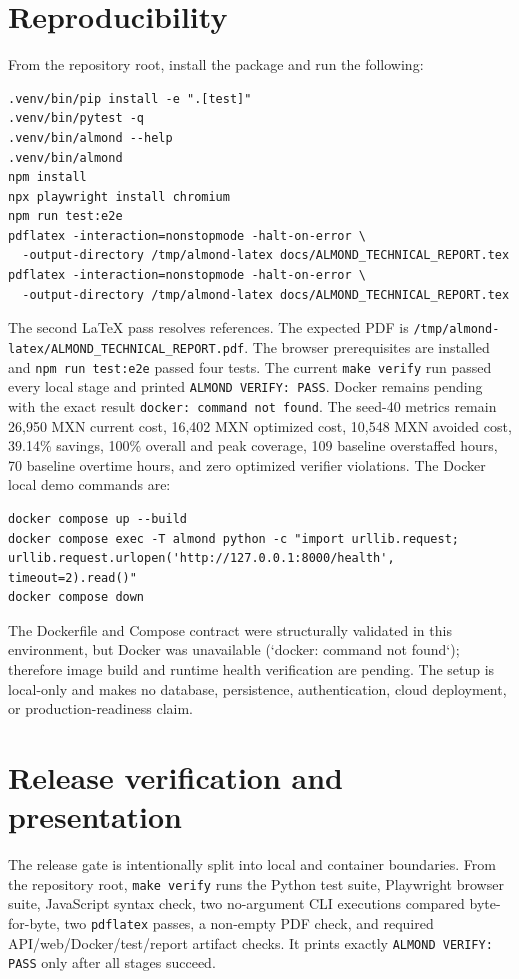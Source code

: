 \documentclass[11pt,a4paper]{article}
\begin{document}
\section{Reproducibility}
\label{sec:repro}
From the repository root, install the package and run the following:
\begin{verbatim}
.venv/bin/pip install -e ".[test]"
.venv/bin/pytest -q
.venv/bin/almond --help
.venv/bin/almond
npm install
npx playwright install chromium
npm run test:e2e
pdflatex -interaction=nonstopmode -halt-on-error \
  -output-directory /tmp/almond-latex docs/ALMOND_TECHNICAL_REPORT.tex
pdflatex -interaction=nonstopmode -halt-on-error \
  -output-directory /tmp/almond-latex docs/ALMOND_TECHNICAL_REPORT.tex
\end{verbatim}
The second LaTeX pass resolves references. The expected PDF is \texttt{/tmp/almond-latex/ALMOND\_TECHNICAL\_REPORT.pdf}. The browser prerequisites are installed and \texttt{npm run test:e2e} passed four tests. The current \texttt{make verify} run passed every local stage and printed \texttt{ALMOND VERIFY: PASS}. Docker remains pending with the exact result \texttt{docker: command not found}. The seed-40 metrics remain 26,950 MXN current cost, 16,402 MXN optimized cost, 10,548 MXN avoided cost, 39.14\% savings, 100\% overall and peak coverage, 109 baseline overstaffed hours, 70 baseline overtime hours, and zero optimized verifier violations.
The Docker local demo commands are:
\begin{verbatim}
docker compose up --build
docker compose exec -T almond python -c "import urllib.request; urllib.request.urlopen('http://127.0.0.1:8000/health', timeout=2).read()"
docker compose down
\end{verbatim}
The Dockerfile and Compose contract were structurally validated in this environment, but Docker was unavailable (`docker: command not found`); therefore image build and runtime health verification are pending. The setup is local-only and makes no database, persistence, authentication, cloud deployment, or production-readiness claim.

\section{Release verification and presentation}
The release gate is intentionally split into local and container boundaries. From the repository root, \texttt{make verify} runs the Python test suite, Playwright browser suite, JavaScript syntax check, two no-argument CLI executions compared byte-for-byte, two \texttt{pdflatex} passes, a non-empty PDF check, and required API/web/Docker/test/report artifact checks. It prints exactly \texttt{ALMOND VERIFY: PASS} only after all stages succeed.
\end{document}
